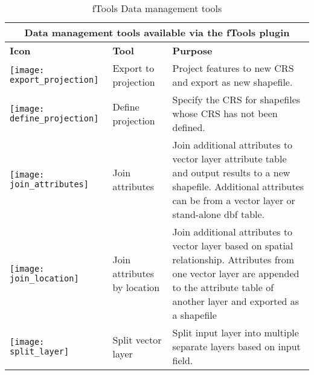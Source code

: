 \begin{table}[ht]
\centering
\begin{tabular}{|m{1cm}|m{3cm}|m{9cm}|}
 \hline \multicolumn{3}{|c|}{\textbf{Data management tools available via the fTools plugin}} \\
 \hline \textbf{Icon} & \textbf{Tool} & \textbf{Purpose} \\
 \hline \texttt{[image: export\_projection]} & Export to projection & 
Project features to new CRS and export as new shapefile. \\
 \hline \texttt{[image: define\_projection]} & Define projection & 
Specify the CRS for shapefiles whose CRS has not been defined. \\
 \hline \texttt{[image: join\_attributes]} & Join attributes & Join 
additional attributes to vector layer attribute table and output results 
to a new shapefile. Additional attributes can be from a vector layer or 
stand-alone dbf table. \\
 \hline \texttt{[image: join\_location]} & Join attributes by 
location & Join additional attributes to vector layer based on spatial 
relationship. Attributes from one vector layer are appended to the attribute 
table of another layer and exported as a shapefile \\
 \hline \texttt{[image: split\_layer]} & Split vector layer & 
Split input layer into multiple separate layers based on input field. \\
 \hline
\end{tabular}
\caption{fTools Data management tools}\label{tab:fTool_data_management}
\end{table}
